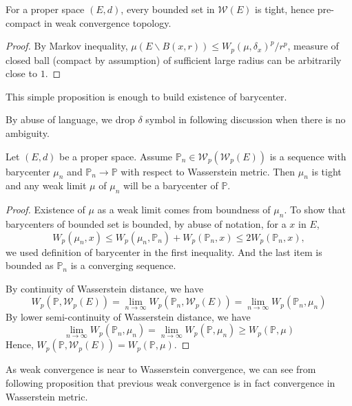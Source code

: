 \begin{prop}
	For a proper space $(E,d)$, every bounded set in $\mathcal{W}(E)$ is tight, hence pre-compact in weak convergence topology.
\end{prop}
\begin{proof}
	By Markov inequality, $\mu(E\backslash B(x,r)) \leq W_p(\mu, \delta_x)^p/r^p$, measure of closed ball (compact by assumption) of sufficient large radius can be arbitrarily close to $1$.
\end{proof}

This simple proposition is enough to build existence of barycenter.

By abuse of language, we drop $\delta$ symbol in following discussion when there is no ambiguity.
\begin{thm}
	Let $(E,d)$ be a proper space. Assume $\mathbb{P}_n \in \mathcal{W}_p(\mathcal{W}_p(E))$ is a sequence with barycenter $\mu_n$ and $\mathbb{P}_n \rightarrow \mathbb{P}$ with respect to Wasserstein metric. Then $\mu_n$ is tight and any weak limit $\mu$ of $\mu_n$ will be a barycenter of $\mathbb{P}$.
\end{thm}

\begin{proof}
	Existence of $\mu$ as a weak limit comes from boundness of $\mu_n$.
	To show that barycenters of bounded set is bounded, by abuse of notation, for a $x$ in $E$,
	\[
		W_p(\mu_n, x) \leq W_p(\mu_n, \mathbb{P}_n)  + W_p(\mathbb{P}_n, x) \leq 2 W_p(\mathbb{P}_n , x),
	\]
	we used definition of barycenter in the first inequality. And the last item is bounded as $\mathbb{P}_n$ is a converging sequence.

	By continuity of Wasserstein distance, we have
	\[
		W_p(\mathbb{P}, \mathcal{W}_p(E)) = \lim_{n \rightarrow \infty}W_p(\mathbb{P}_n, \mathcal{W}_p(E))=\lim_{n \rightarrow \infty}W_p(\mathbb{P}_n, \mu_n)
	\]
	By lower semi-continuity of Wasserstein distance, we have
	\[
		\lim_{n \rightarrow \infty}W_p(\mathbb{P}_n, \mu_n)=\lim_{n \rightarrow \infty}W_p(\mathbb{P}, \mu_n)\geq W_p(\mathbb{P}, \mu)
	\]
	Hence, $W_p(\mathbb{P}, \mathcal{W}_p(E)) =W_p(\mathbb{P}, \mu)$.
\end{proof}

As weak convergence is near to Wasserstein convergence, we can see from following proposition that previous weak convergence is in fact convergence in Wasserstein metric.

